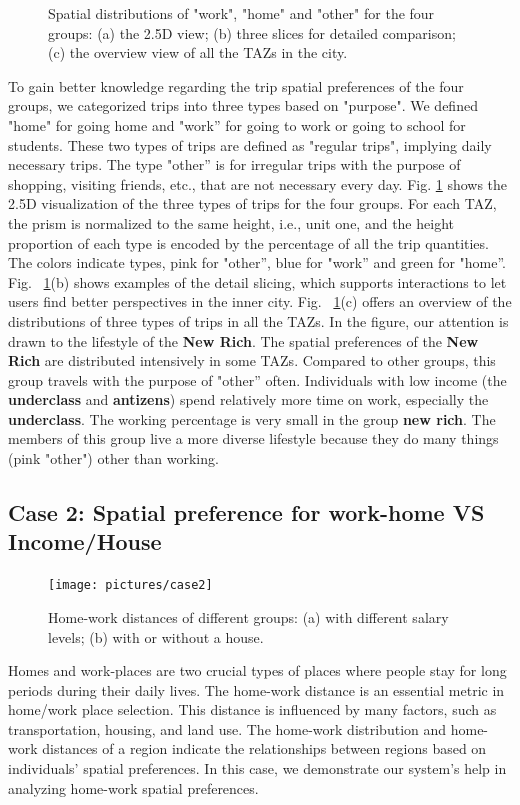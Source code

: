 \documentclass{ieeeaccess}
\begin{document}
\begin{figure}[htb!]
 \caption{Spatial distributions of "work", "home" and "other" for the four groups: (a) the 2.5D view; (b) three slices for detailed comparison; (c) the overview view of all the TAZs in the city.}
 \label{case13}
\end{figure}

To gain better knowledge regarding the trip spatial preferences of the four groups, we categorized trips into three types based on "purpose". We defined "home" for going home and "work'' for going to work or going to school for students. These two types of trips are defined as "regular trips", implying daily necessary trips. The type "other'' is for irregular trips with the purpose of shopping, visiting friends, etc., that are not necessary every day. Fig. \ref{case13} shows the 2.5D visualization of the three types of trips for the four groups. For each TAZ, the prism is normalized to the same height, i.e., unit one, and the height proportion of each type is encoded by the percentage of all the trip quantities. The colors indicate types, pink for "other'', blue for "work'' and green for "home''. Fig. ~\ref{case13}(b) shows examples of the detail slicing, which supports interactions to let users find better perspectives in the inner city. Fig. ~\ref{case13}(c) offers an overview of the distributions of three types of trips in all the TAZs. In the figure, our attention is drawn to the lifestyle of the \textbf{New Rich}. The spatial preferences of the \textbf{New Rich} are distributed intensively in some TAZs. Compared to other groups, this group travels with the purpose of "other'' often. Individuals with low income (the \textbf{underclass} and \textbf{antizens}) spend relatively more time on work, especially the \textbf{underclass}. The working percentage is very small in the group \textbf{new rich}. The members of this group live a more diverse lifestyle because they do many things (pink "other") other than working.


\subsection{Case 2: Spatial preference for work-home VS Income/House}


\begin{figure}[htb!]
 \centering
 \texttt{[image: pictures/case2]}
 \caption{Home-work distances of different groups: (a) with different salary levels; (b) with or without a house.}
 \label{case2}
\end{figure}

Homes and work-places are two crucial types of places where people stay for long periods during their daily lives. The home-work distance is an essential metric in home/work place selection. This distance is influenced by many factors, such as transportation, housing, and land use. The home-work distribution and home-work distances of a region indicate the relationships between regions based on individuals' spatial preferences. In this case, we demonstrate our system's help in analyzing home-work spatial preferences.
\end{document}

